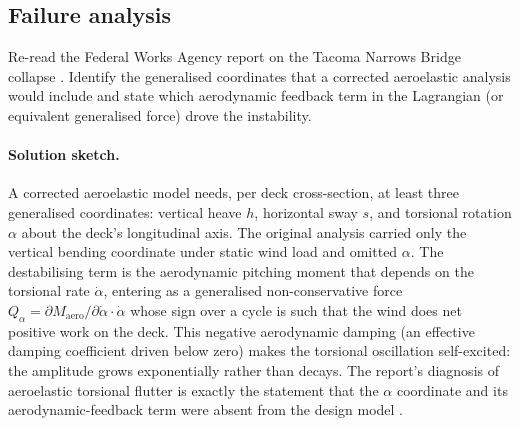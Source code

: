 \subsection*{Failure analysis}

\begin{exercise}
Re-read the Federal Works Agency report on the Tacoma Narrows Bridge
collapse \cite{acc:tacoma-narrows-1941}. Identify the generalised
coordinates that a corrected aeroelastic analysis would include and
state which aerodynamic feedback term in the Lagrangian (or equivalent
generalised force) drove the instability.

\paragraph{Solution sketch.} A corrected aeroelastic model needs, per
deck cross-section, at least three generalised coordinates: vertical
heave $h$, horizontal sway $s$, and torsional rotation $\alpha$ about the
deck's longitudinal axis. The original analysis carried only the
vertical bending coordinate under static wind load and omitted $\alpha$.
The destabilising term is the aerodynamic pitching moment that depends on
the torsional rate $\dot\alpha$, entering as a generalised
non-conservative force $Q_\alpha = \partial M_\text{aero}/\partial\dot
\alpha\cdot\dot\alpha$ whose sign over a cycle is such that the wind does
net positive work on the deck. This negative aerodynamic damping (an
effective damping coefficient driven below zero) makes the torsional
oscillation self-excited: the amplitude grows exponentially rather than
decays. The report's diagnosis of aeroelastic torsional flutter is
exactly the statement that the $\alpha$ coordinate and its
aerodynamic-feedback term were absent from the design model
\cite{acc:tacoma-narrows-1941}.
\end{exercise}

